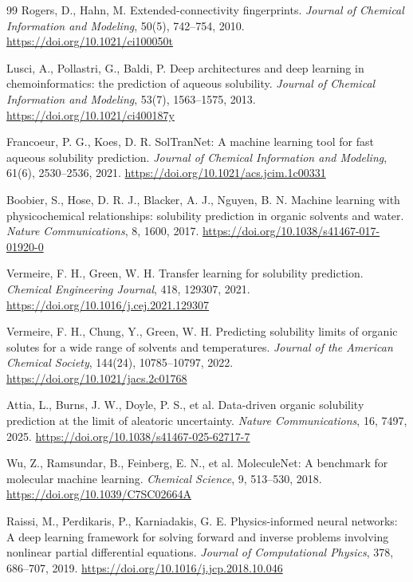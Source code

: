 \documentclass[11pt]{article}
\theoremstyle{definition}
\begin{document}
\begin{thebibliography}{99}
 Rogers, D., Hahn, M. Extended-connectivity fingerprints. \textit{Journal of Chemical Information and Modeling}, 50(5), 742--754, 2010. \url{https://doi.org/10.1021/ci100050t}

 Lusci, A., Pollastri, G., Baldi, P. Deep architectures and deep learning in chemoinformatics: the prediction of aqueous solubility. \textit{Journal of Chemical Information and Modeling}, 53(7), 1563--1575, 2013. \url{https://doi.org/10.1021/ci400187y}

 Francoeur, P. G., Koes, D. R. SolTranNet: A machine learning tool for fast aqueous solubility prediction. \textit{Journal of Chemical Information and Modeling}, 61(6), 2530--2536, 2021. \url{https://doi.org/10.1021/acs.jcim.1c00331}

 Boobier, S., Hose, D. R. J., Blacker, A. J., Nguyen, B. N. Machine learning with physicochemical relationships: solubility prediction in organic solvents and water. \textit{Nature Communications}, 8, 1600, 2017. \url{https://doi.org/10.1038/s41467-017-01920-0}

 Vermeire, F. H., Green, W. H. Transfer learning for solubility prediction. \textit{Chemical Engineering Journal}, 418, 129307, 2021. \url{https://doi.org/10.1016/j.cej.2021.129307}

 Vermeire, F. H., Chung, Y., Green, W. H. Predicting solubility limits of organic solutes for a wide range of solvents and temperatures. \textit{Journal of the American Chemical Society}, 144(24), 10785--10797, 2022. \url{https://doi.org/10.1021/jacs.2c01768}

 Attia, L., Burns, J. W., Doyle, P. S., et al. Data-driven organic solubility prediction at the limit of aleatoric uncertainty. \textit{Nature Communications}, 16, 7497, 2025. \url{https://doi.org/10.1038/s41467-025-62717-7}

 Wu, Z., Ramsundar, B., Feinberg, E. N., et al. MoleculeNet: A benchmark for molecular machine learning. \textit{Chemical Science}, 9, 513--530, 2018. \url{https://doi.org/10.1039/C7SC02664A}

 Raissi, M., Perdikaris, P., Karniadakis, G. E. Physics-informed neural networks: A deep learning framework for solving forward and inverse problems involving nonlinear partial differential equations. \textit{Journal of Computational Physics}, 378, 686--707, 2019. \url{https://doi.org/10.1016/j.jcp.2018.10.046}


\end{thebibliography}
\end{document}
